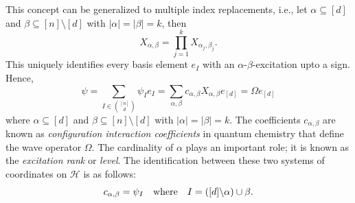 \documentclass[11pt,reqno]{amsart}
\theoremstyle{definition}
\numberwithin{theorem}{section}
\numberwithin{equation}{section}
\begin{document}
\noindent This concept can be generalized to multiple index replacements, i.e., let $\alpha \subseteq [d]$ and $\beta \subseteq [n] \setminus [d]$ with $|\alpha| = |\beta| = k$, then 
\begin{equation}\label{eq: def of X_IJ}
X_{\alpha, \beta} = \prod_{j=1}^k X_{\alpha_j,\beta_j}.
\end{equation}
This uniquely identifies every basis element $e_I$ with an $\alpha$-$\beta$-excitation upto a sign. Hence, 
%
\begin{equation}
\label{eq:FCI}
\psi 
= 
\sum_{I \in \binom{[n]}{d}} \psi_I  e_I 
=
\sum_{\alpha, \beta}
c_{\alpha,\beta} X_{\alpha, \beta}e_{[d]}
=
\Omega e_{[d]}
\end{equation}
%
where $\alpha \subseteq [d]$ and $\beta \subseteq [n] \setminus [d]$ with $|\alpha| = |\beta| = k$. The coefficients $c_{\alpha,\beta}$ are known as {\em configuration interaction coefficients} in quantum chemistry that define the wave operator $\Omega$. The cardinality of $\alpha$ plays an important role; it is known as the {\it excitation rank} or \emph{level}. The identification between these two systems of coordinates on $\mathcal{H}$ is  as follows:
 \begin{equation}
 \label{eq:cpsi}  
 c_{\alpha,\beta} = \psi_I
 \quad {\rm where} \quad 
 I = ([d] \backslash \alpha) \cup \beta. 
 \end{equation}
\end{document}
